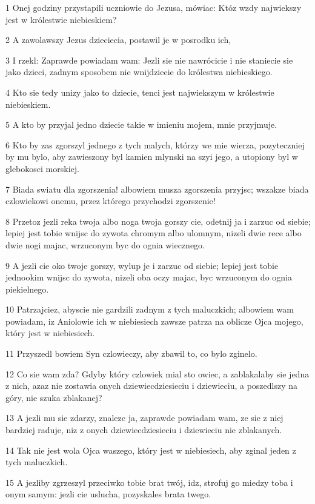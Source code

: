 \par 1 Onej godziny przystapili uczniowie do Jezusa, mówiac: Któz wzdy najwiekszy jest w królestwie niebieskiem?
\par 2 A zawolawszy Jezus dzieciecia, postawil je w posrodku ich,
\par 3 I rzekl: Zaprawde powiadam wam: Jezli sie nie nawrócicie i nie staniecie sie jako dzieci, zadnym sposobem nie wnijdziecie do królestwa niebieskiego.
\par 4 Kto sie tedy unizy jako to dziecie, tenci jest najwiekszym w królestwie niebieskiem.
\par 5 A kto by przyjal jedno dziecie takie w imieniu mojem, mnie przyjmuje.
\par 6 Kto by zas zgorszyl jednego z tych malych, którzy we mie wierza, pozyteczniej by mu bylo, aby zawieszony byl kamien mlynski na szyi jego, a utopiony byl w glebokosci morskiej.
\par 7 Biada swiatu dla zgorszenia! albowiem musza zgorszenia przyjsc; wszakze biada czlowiekowi onemu, przez którego przychodzi zgorszenie!
\par 8 Przetoz jezli reka twoja albo noga twoja gorszy cie, odetnij ja i zarzuc od siebie; lepiej jest tobie wnijsc do zywota chromym albo ulomnym, nizeli dwie rece albo dwie nogi majac, wrzuconym byc do ognia wiecznego.
\par 9 A jezli cie oko twoje gorszy, wylup je i zarzuc od siebie; lepiej jest tobie jednookim wnijsc do zywota, nizeli oba oczy majac, byc wrzuconym do ognia piekielnego.
\par 10 Patrzajciez, abyscie nie gardzili zadnym z tych maluczkich; albowiem wam powiadam, iz Aniolowie ich w niebiesiech zawsze patrza na oblicze Ojca mojego, który jest w niebiesiech.
\par 11 Przyszedl bowiem Syn czlowieczy, aby zbawil to, co bylo zginelo.
\par 12 Co sie wam zda? Gdyby który czlowiek mial sto owiec, a zablakalaby sie jedna z nich, azaz nie zostawia onych dziewiecdziesieciu i dziewieciu, a poszedlszy na góry, nie szuka zblakanej?
\par 13 A jezli mu sie zdarzy, znalezc ja, zaprawde powiadam wam, ze sie z niej bardziej raduje, niz z onych dziewiecdziesieciu i dziewieciu nie zblakanych.
\par 14 Tak nie jest wola Ojca waszego, który jest w niebiesiech, aby zginal jeden z tych maluczkich.
\par 15 A jezliby zgrzeszyl przeciwko tobie brat twój, idz, strofuj go miedzy toba i onym samym: jezli cie uslucha, pozyskales brata twego.
